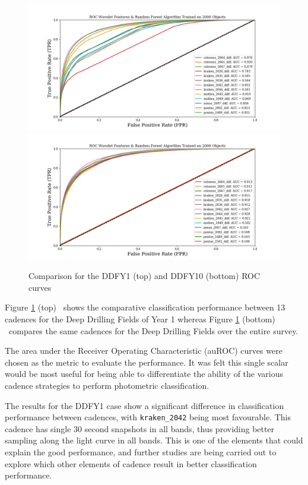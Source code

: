 \documentclass[a4paper,10pt]{article}
\begin{document}
\begin{figure}[htbp]
  \begin{center}
    \includegraphics[width=0.9\linewidth]{photometric_classification_roc_results_ddfY1.png}
    \includegraphics[width=0.9\linewidth]{photometric_classification_roc_results_ddfY10.png}
    \caption{Comparison for the DDFY1 (top) and DDFY10 (bottom) ROC curves}
    \label{fig:rocs}
  \end{center}
\end{figure}


Figure \ref{fig:rocs} (top) ~shows the comparative classification performance between 13 cadences for the Deep
Drilling Fields of Year 1 whereas Figure \ref{fig:rocs} (bottom) ~compares the same
cadences for the Deep Drilling Fields over the entire survey.

The area under the Receiver Operating Characteristic (auROC) curves were chosen as the metric
to evaluate the performance. It was felt this single scalar would be most useful
for being able to differentiate the ability of the various cadence strategies
to perform photometric classification.

The results for the DDFY1 case show a significant difference in classification
performance between cadences, with {\tt kraken\_2042} being most favourable.
This cadence has single 30 second snapshots in all bands, thus providing better
sampling along the light curve in all bands. This is one of the elements that could explain
the good performance, and further studies are being carried out to explore which
other elements of cadence result in better classification performance.
\end{document}
